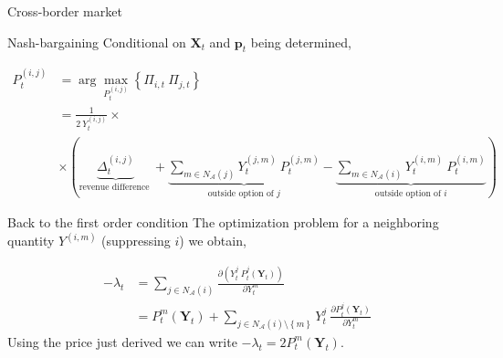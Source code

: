 \documentclass{beamer}
\newcommand{\matr}[1]{\bm{#1}}
\newcommand{\set}[1]{\left\{#1\right\}}
\newcommand{\Y}{\matr{Y}}
\begin{document}
\begin{frame}{Cross-border market}
    \centering
    \resizebox{\textwidth}{!}{}
\end{frame}

\begin{frame}{Nash-bargaining}
    Conditional on $\matr{X}_t$ and $\matr{p}_t$ being determined,

    \begin{equation*}
        \begin{split}
            P_t^{(i, j)} &= \arg \max_{P_t^{(i, j)}} \left\{\Pi_{i, t} \  \Pi_{j, t} \right\} \\
            &= \frac{1}{2\  Y_t^{(i, j)}} \times \\
            &\times \left( \underbrace{\Delta^{(i, j)}_t}_{\text{revenue difference }}
            + \underbrace{\sum_{m\in N_{\mathcal{A}}(j)} Y_t^{(j, m)} \  P_t^{(j, m)}}_{\text{outside option of } j}
            - \underbrace{\sum_{m \in N_{\mathcal{A}}(i)} Y_t^{(i, m)} \  P_t^{(i, m)}}_{\text{outside option of } i} \right)
        \end{split}
    \end{equation*}
\end{frame}

\begin{frame}{Back to the first order condition}
    The optimization problem for a neighboring quantity $Y^{(i, m)}$ (suppressing $i$) we obtain,

    \begin{equation*}
        \begin{split}
            -\lambda_t &= \sum_{j \in N_{\mathcal{A}}(i)} \frac{\partial (Y_t^j \  P_t^j(\Y_t))}{\partial Y_t^m} \\
            &= P_t^m(\Y_t) + \sum_{j \in N_{\mathcal{A}}(i) \setminus \set{m}} Y_t^j \  \frac{\partial P_t^j(\Y_t)}{\partial Y_t^m}
        \end{split}
    \end{equation*}
    Using the price just derived we can write $-\lambda_t = 2 P_t^m(\Y_t) $.

\end{frame}
\end{document}
